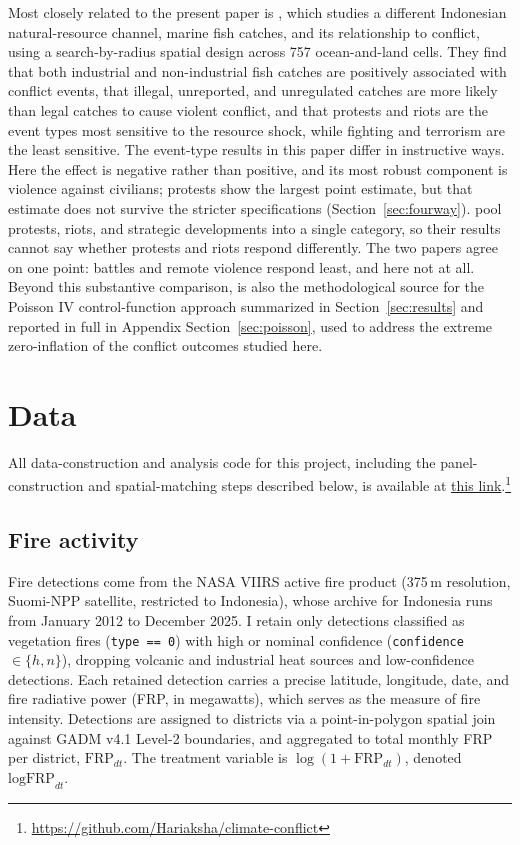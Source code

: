 \documentclass[12pt]{article}
\begin{document}
Most closely related to the present paper is \citet{lu2023fish}, which studies a different Indonesian natural-resource channel, marine fish catches, and its relationship to conflict, using a search-by-radius spatial design across 757 ocean-and-land cells. They find that both industrial and non-industrial fish catches are positively associated with conflict events, that illegal, unreported, and unregulated catches are more likely than legal catches to cause violent conflict, and that protests and riots are the event types most sensitive to the resource shock, while fighting and terrorism are the least sensitive. The event-type results in this paper differ in instructive ways. Here the effect is negative rather than positive, and its most robust component is violence against civilians; protests show the largest point estimate, but that estimate does not survive the stricter specifications (Section~\ref{sec:fourway}). \citet{lu2023fish} pool protests, riots, and strategic developments into a single category, so their results cannot say whether protests and riots respond differently. The two papers agree on one point: battles and remote violence respond least, and here not at all. Beyond this substantive comparison, \citet{lu2023fish} is also the methodological source for the Poisson IV control-function approach summarized in Section~\ref{sec:results} and reported in full in Appendix Section~\ref{sec:poisson}, used to address the extreme zero-inflation of the conflict outcomes studied here.

\section{Data}
\label{sec:data}

All data-construction and analysis code for this project, including the panel-construction and spatial-matching steps described below, is available at \href{https://github.com/Hariaksha/climate-conflict}{this link}.\footnote{\url{https://github.com/Hariaksha/climate-conflict}}

\subsection{Fire activity}

Fire detections come from the NASA VIIRS active fire product (375\,m resolution, Suomi-NPP satellite, restricted to Indonesia), whose archive for Indonesia runs from January 2012 to December 2025. I retain only detections classified as vegetation fires (\texttt{type == 0}) with high or nominal confidence (\texttt{confidence} $\in \{h, n\}$), dropping volcanic and industrial heat sources and low-confidence detections. Each retained detection carries a precise latitude, longitude, date, and fire radiative power (FRP, in megawatts), which serves as the measure of fire intensity. Detections are assigned to districts via a point-in-polygon spatial join against GADM v4.1 Level-2 boundaries, and aggregated to total monthly FRP per district, $\text{FRP}_{dt}$. The treatment variable is $\log(1+\text{FRP}_{dt})$, denoted $\text{logFRP}_{dt}$.
\end{document}
